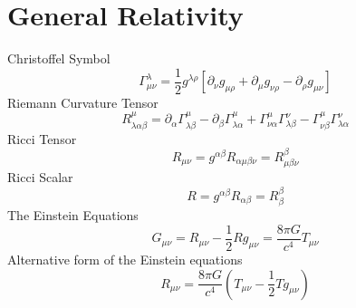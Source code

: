 \documentclass[11pt]{cuthesis}
\newcommand{\mn}{_{\mu\nu}}
\begin{document}
\appendix
\appendixpage
\addappheadtotoc
\section{General Relativity}

Christoffel Symbol
\begin{equation} \label{christ}
\Gamma^\lambda\mn=\frac{1}{2}g^{\lambda \rho} [\partial_\nu g_{\mu \rho} + \partial_\mu g_{\nu \rho}-\partial_\rho g\mn]
\end{equation}
Riemann Curvature Tensor  
\begin{equation} \label{rct}
R^\mu_{\lambda \alpha \beta} = \partial_\alpha \Gamma^\mu_{\lambda \beta} -\partial_\beta \Gamma^\mu_{\lambda \alpha} + \Gamma^\mu_{\nu \alpha} \Gamma^\nu_{\lambda \beta} - \Gamma^\mu_{\nu \beta} \Gamma^\nu_{\lambda \alpha}
\end{equation}
Ricci Tensor
\begin{equation} \label{rt}
R\mn=g^{\alpha \beta} R_{\alpha \mu \beta \nu}=R^\beta_{\mu \beta \nu}
\end{equation}
Ricci Scalar
\begin{equation} \label{rs}
R=g^{\alpha \beta}R_{\alpha \beta}=R^\beta_\beta
\end{equation}
The Einstein Equations
\begin{equation} \label{eineq}
G\mn =R\mn -\frac{1}{2} R g\mn=\frac{8 \pi G}{c^4}T\mn
\end{equation}
Alternative form of the Einstein equations
\begin{equation} \label{alt einstein}
R\mn = \frac{8 \pi G}{c^4}\left( T\mn - \frac{1}{2}Tg\mn \right) 
\end{equation}
\end{document}
